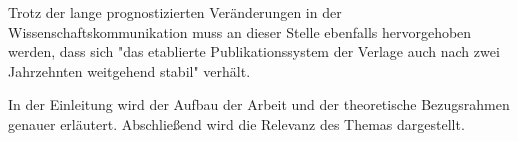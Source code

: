 Trotz der lange prognostizierten Veränderungen in der Wissenschaftskommunikation muss an dieser Stelle ebenfalls hervorgehoben werden, dass sich "das etablierte Publikationssystem der Verlage auch nach zwei Jahrzehnten weitgehend stabil"\cite{Hankop_2014} verhält.

In der Einleitung wird der Aufbau der Arbeit und der theoretische Bezugsrahmen genauer erläutert. Abschließend wird die Relevanz des Themas dargestellt.
